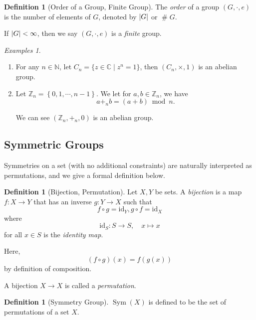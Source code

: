 \documentclass{article}
\theoremstyle{definition}
\newtheorem{definition}[theorem]{Definition}
\theoremstyle{remark}
\DeclarePairedDelimiter{\abs}{\lvert}{\rvert}
\newcommand{\pqty}[1]{\left(#1\right)}
\newcommand{\Bqty}[1]{\left\{#1\right\}}
\newcommand{\set}[2]{\{#1\mid #2\}}
\newcommand{\functiondomain}[3]{#1:#2\to #3}
\newcommand{\function}[5]{#1:#2\to #3,\quad #4\mapsto #5}
\newcommand{\identity}{\mathrm{id}}
\newcommand{\ZZ}{\mathbb{Z}}
\newcommand{\CC}{\mathbb{C}}
\newcommand{\NN}{\mathbb{N}}
\newcommand{\Sym}{\operatorname{Sym}}
\newtheorem*{examples*}{Examples}
\newcommand{\size}{\mathop{\#}}
\newcommand{\modulo}{\bmod}
\begin{document}
\begin{definition}[Order of a Group, Finite Group]
    \label{def:order-group}%
    The \emph{order} of a group \(\pqty{G, \cdot, e}\) is the number of elements of \(G\), denoted by \(\abs{G}\) or \(\size G\).

    If \(\abs{G} < \infty\), then we say \(\pqty{G, \cdot, e}\) is a \emph{finite} group.
\end{definition}

\begin{examples*}
    \begin{enumerate}
        \item For any \(n \in \NN\), let \(C_n = \set{z \in \CC}{z^n = 1}\), then \(\pqty{C_n, \times, 1}\) is an abelian group.
        \item Let \(\ZZ_n = \Bqty{0, 1, \cdots, n - 1}\). We let for \(a, b \in \ZZ_n\), we have
        \[
            a +_n b = (a + b) \modulo n.
        \]

        We can see \(\pqty{\ZZ_n, +_n, 0}\) is an abelian group.
    \end{enumerate}
\end{examples*}

\subsection{Symmetric Groups}
\label{sec:symmetric-groups}

Symmetries on a set (with no additional constraints) are naturally interpreted as permutations, and we give a formal definition below.

\begin{definition}[Bijection, Permutation]
    \label{def:bijection-permutation}%
    Let \(X, Y\) be sets. A \emph{bijection} is a map \(\functiondomain{f}{X}{Y}\) that has an inverse \(\functiondomain{g}{Y}{X}\) such that
    \[
        f \circ g = \identity_Y, g \circ f = \identity_X
    \]
    where
    \[
        \function{\identity_S}{S}{S}{x}{x}
    \]
    for all \(x \in S\) is the \emph{identity map}.

    Here,
    \[
        \pqty{f \circ g}\pqty{x} = f \pqty{g \pqty{x}}
    \]
    by definition of composition.

    A bijection \(X \to X\) is called a \emph{permutation}.
\end{definition}

\begin{definition}[Symmetry Group]
    \label{def:symmetry-group}%
    \(\Sym\pqty{X}\) is defined to be the set of permutations of a set \(X\).
\end{definition}
\end{document}
